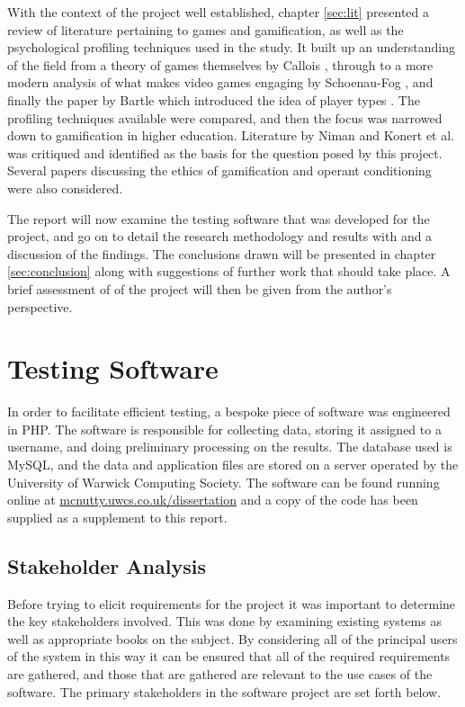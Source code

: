 \documentclass[12pt,a4paper,twoside]{report}
\begin{document}
With the context of the project well established, chapter \ref{sec:lit} presented a review of literature pertaining to games and gamification, as well as the psychological profiling techniques used in the study. It built up an understanding of the field from a theory of games themselves by Callois \cite{caillois1961man}, through to a more modern analysis of what makes video games engaging by Schoenau-Fog \cite{schoenau2011player}, and finally the paper by Bartle which introduced the idea of player types \cite{bartle1996hearts}. The profiling techniques available were compared, and then the focus was narrowed down to gamification in higher education. Literature by Niman \cite{niman2014gamification} and Konert et al. \cite{konertmodeling} was critiqued and identified as the basis for the question posed by this project. Several papers discussing the ethics of gamification and operant conditioning were also considered.

The report will now examine the testing software that was developed for the project, and go on to detail the research methodology and results with and a discussion of the findings. The conclusions drawn will be presented in chapter \ref{sec:conclusion} along with suggestions of further work that should take place. A brief assessment of of the project will then be given from the author's perspective.

\chapter{Testing Software}
\label{sec:software}
In order to facilitate efficient testing, a bespoke piece of software was engineered in PHP. The software is responsible for collecting data, storing it assigned to a username, and doing preliminary processing on the results. The database used is MySQL, and the data and application files are stored on a server operated by the University of Warwick Computing Society. The software can be found running online at \url{mcnutty.uwcs.co.uk/dissertation} and a copy of the code has been supplied as a supplement to this report.

\section{Stakeholder Analysis}
Before trying to elicit requirements for the project it was important to determine the key stakeholders involved. This was done by examining existing systems as well as appropriate books on the subject. By considering all of the principal users of the system in this way it can be ensured that all of the required requirements are gathered, and those that are gathered are relevant to the use cases of the software. The primary stakeholders in the software project are set forth below.
\end{document}
